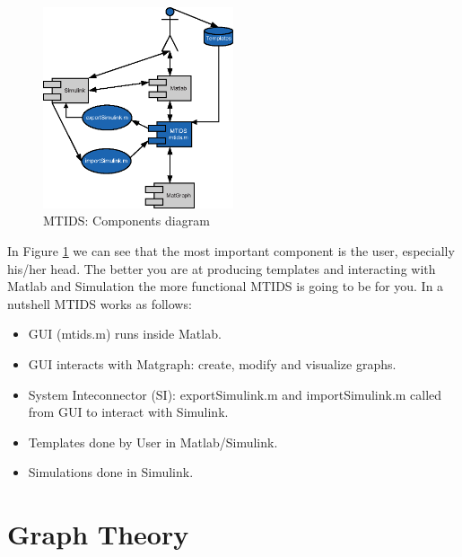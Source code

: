 \documentclass[a4paper,twoside, openright,12pt]{report}
\begin{document}
 

\begin{figure}[htb]
\centering
\includegraphics[width=0.5\textwidth]{pics/uml.eps}
\caption[MTIDS components]{MTIDS: Components diagram}
\label{componentsFig}
\end{figure}

In Figure \ref{componentsFig} we can see that the most important component is the user, especially his/her head. The better you are at producing templates
and interacting with Matlab and Simulation the more functional MTIDS is going to be for you.
In a nutshell MTIDS works as follows:
\begin{itemize}
\item GUI (mtids.m) runs inside Matlab.
\item GUI interacts with Matgraph: create, modify and visualize graphs.  
\item System Inteconnector (SI): exportSimulink.m and importSimulink.m called from GUI to interact with Simulink.
\item Templates done by User in Matlab/Simulink.
\item Simulations done in Simulink.
\end{itemize}
%  
% 

\chapter{Graph Theory}\label{chapter2}
 
\end{document}
